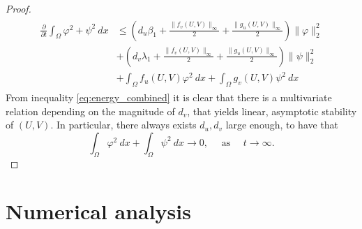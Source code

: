 \documentclass[12pt, a4paper]{article}
\theoremstyle{break}
\theoremstyle{break}
\theoremstyle{break}
\theoremstyle{break}
\theoremstyle{break}
\theoremstyle{break}
\theoremstyle{break}
\begin{document}
\begin{proof}
    \begin{align}
        \label{eq:energy_combined}
        \begin{split}
            \frac{\partial}{\partial t} \int_\Omega \varphi^2 + \psi^2\:dx
            &\leq
            \left(d_u \beta_1 + \frac{\|f_v(U,V)\|_\infty}{2} + \frac{\|g_u(U,V)\|_\infty}{2}\right) \|\varphi\|_2^2 \\
            &+
            \left(d_v \lambda_1 + \frac{\|f_v(U,V)\|_\infty}{2} + \frac{\|g_u(U,V)\|_\infty}{2} \right) \|\psi\|_2^2 \\
            &+ 
            \int_\Omega f_u(U,V) \varphi^2\:dx
            +
            \int_\Omega g_v(U,V) \psi^2 \:dx
        \end{split}
    \end{align}
    From inequality \eqref{eq:energy_combined} it is clear that there is a multivariate relation depending on the magnitude of $d_v$, that yields linear, asymptotic stability of $(U, V)$. In particular, there always exists $d_u, d_v$ large enough, to have that
    \begin{equation}
        \int_\Omega \varphi^2\:dx + \int_\Omega \psi^2\:dx \rightarrow 0, \quad \text{ as } \quad t \rightarrow \infty.
    \end{equation}
\end{proof}
\section{Numerical analysis}
\end{document}
